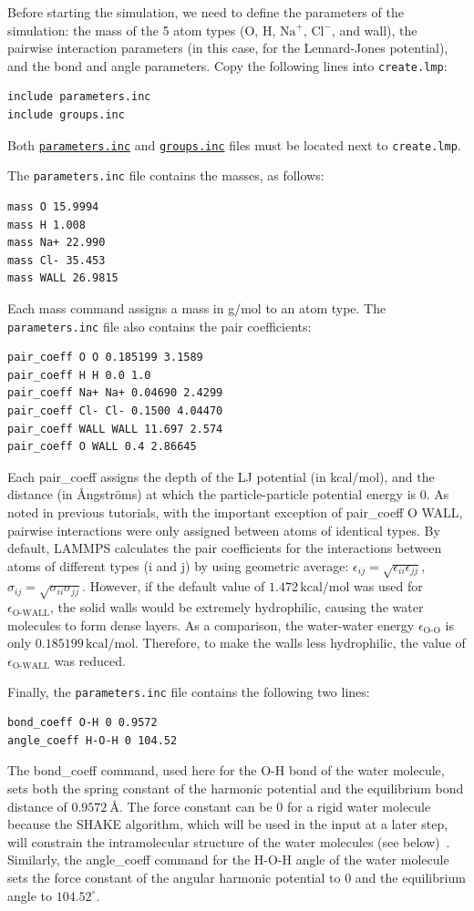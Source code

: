 \documentclass[9pt,tutorial]{livecoms}
\newcommand{\lmpcmd}[1]{\colorbox{listing}{\textcolor{command}{\small{#1}}}} %
\newcommand{\flecmd}[1]{\textcolor{command}{\texttt{#1}}} %
\newcommand{\dwlcmd}[1]{\textcolor{download}{\texttt{#1}}} %
\newcommand{\filepath}{https://raw.githubusercontent.com/lammpstutorials/lammpstutorials-article/main/files/}
\begin{document}
Before starting the simulation, we need to define the parameters of the
simulation: the mass of the 5 atom types (O, H, $\text{Na}^+$, $\text{Cl}^-$,
and wall), the pairwise interaction parameters (in this case, for the
Lennard-Jones potential), and the bond and angle parameters.  Copy the following
lines into \flecmd{create.lmp}:
\begin{lstlisting}
include parameters.inc
include groups.inc
\end{lstlisting}
Both \href{\filepath tutorial4/parameters.inc}{\dwlcmd{parameters.inc}}
and \href{\filepath tutorial4/groups.inc}{\dwlcmd{groups.inc}} files
must be located next to \flecmd{create.lmp}.

The \flecmd{parameters.inc} file contains the masses, as follows:
\begin{lstlisting}
mass O 15.9994
mass H 1.008
mass Na+ 22.990
mass Cl- 35.453
mass WALL 26.9815
\end{lstlisting}
Each \lmpcmd{mass} command assigns a mass in g/mol to an atom type.
The \flecmd{parameters.inc} file also contains the pair coefficients:
\begin{lstlisting}
pair_coeff O O 0.185199 3.1589
pair_coeff H H 0.0 1.0
pair_coeff Na+ Na+ 0.04690 2.4299
pair_coeff Cl- Cl- 0.1500 4.04470
pair_coeff WALL WALL 11.697 2.574
pair_coeff O WALL 0.4 2.86645
\end{lstlisting}
Each \lmpcmd{pair\_coeff} assigns the depth of the LJ potential (in
kcal/mol), and the distance (in Ångströms) at which the
particle-particle potential energy is 0.  As noted in previous
tutorials, with the important exception of \lmpcmd{pair\_coeff O WALL},
pairwise interactions were only assigned between atoms of identical
types.  By default, LAMMPS calculates the pair coefficients for the
interactions between atoms of different types (i and j) by using
geometric average: $\epsilon_{ij} = \sqrt{\epsilon_{ii} \epsilon_{jj}}$,
$\sigma_{ij} = \sqrt{\sigma_{ii} \sigma_{jj}}$.  However, if the default
value of $1.472\,\text{kcal/mol}$ was used for $\epsilon_\text{O-WALL}$,
the solid walls would be extremely hydrophilic, causing the water
molecules to form dense layers.  As a comparison, the water-water energy
$\epsilon_\text{O-O}$ is only $0.185199\,\text{kcal/mol}$.  Therefore,
to make the walls less hydrophilic, the value of
$\epsilon_\text{O-WALL}$ was reduced.

Finally, the \flecmd{parameters.inc} file contains the following two lines:
\begin{lstlisting}
bond_coeff O-H 0 0.9572
angle_coeff H-O-H 0 104.52
\end{lstlisting}
The \lmpcmd{bond\_coeff} command, used here for the O-H bond of the
water molecule, sets both the spring constant of the harmonic potential
and the equilibrium bond distance of $0.9572~\text{\AA{}}$.  The force
constant can be 0 for a rigid water molecule because the SHAKE
algorithm, which will be used in the input at a later
step, will constrain the intramolecular structure of the water molecules (see
below)~\cite{ryckaert1977numerical, andersen1983rattle}.  Similarly, the
\lmpcmd{angle\_coeff} command for the H-O-H angle of the water molecule
sets the force constant of the angular harmonic potential to 0 and the
equilibrium angle to $104.52^\circ$.
\end{document}
